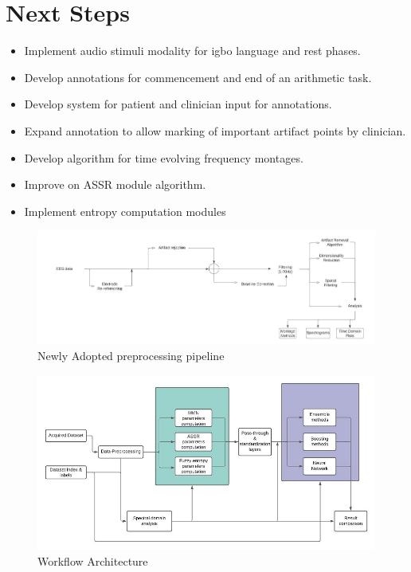 \documentclass[10pt]{article}
\begin{document}
\section{Next Steps}\label{sec:actionPoints}
\begin{itemize}
  \item Implement audio stimuli modality for igbo language and rest phases.
  \item Develop annotations for commencement and end of an arithmetic task.
  \item Develop system for patient and clinician input for annotations.
  \item Expand annotation to allow marking of important artifact points by clinician.
  \item Develop algorithm for time evolving frequency montages.
  \item Improve on ASSR module algorithm.
  \item Implement entropy computation modules
\end{itemize}

\clearpage
\begin{figure}
  \includegraphics{preProcessing.jpeg}
  \caption{Newly Adopted preprocessing pipeline}
  \label{fig:preprocessPipeline}
\end{figure}
\begin{figure}
  \includegraphics{workflowArchitecture.jpeg}
  \caption{Workflow Architecture}
  \label{fig:workflow Architecture}
\end{figure}
\end{document}
